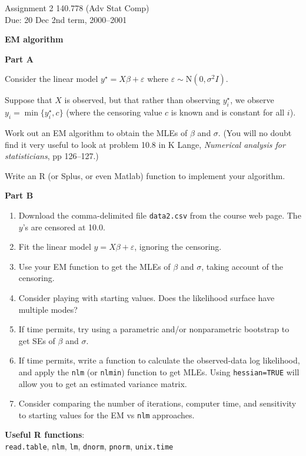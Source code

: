 \documentclass[12pt]{article}
\begin{document}
{ \large
Assignment 2 \hfill 140.778 (Adv Stat Comp)
\\
Due: 20 Dec \hfill 2nd term, 2000--2001 }

\bigskip \bigskip

{\large \textbf{EM algorithm}}

\bigskip 

\textbf{Part A}

\bigskip

Consider the linear model $y^\star = X \beta + \varepsilon$ where
$\varepsilon \sim \text{N}(0, \sigma^2I)$.  

\bigskip

Suppose that $X$ is observed, but that rather than observing $y_i^\star$, we
observe $y_i = \min\{ y_i^\star, c \}$ (where the censoring value $c$
is known and is constant for all $i$).

\bigskip

Work out an EM algorithm to obtain the MLEs of $\beta$ and $\sigma$.
(You will no doubt find it very useful to look at problem 10.8 in K
Lange, \emph{Numerical analysis for statisticians}, pp 126--127.)  

\bigskip

Write an R (or Splus, or even Matlab) function to implement your
algorithm.  

\bigskip \bigskip



\textbf{Part B}

\smallskip

\begin{enumerate}

\item Download the comma-delimited file \verb|data2.csv| from the
  course web page.  The $y$'s are censored at 10.0. 

\item Fit the linear model $y = X\beta + \varepsilon$, ignoring the
  censoring.

\item Use your EM function to get the MLEs of $\beta$ and $\sigma$,
  taking account of the censoring.

\item Consider playing with starting values.  Does the likelihood
  surface have multiple modes?

\item If time permits, try using a parametric and/or nonparametric
  bootstrap to get SEs of $\beta$ and $\sigma$.  

\item If time permits, write a function to calculate the observed-data
  log likelihood, and apply the \verb|nlm| (or \verb|nlmin|) function
  to get MLEs.  Using \verb|hessian=TRUE| will allow you to get an
  estimated variance matrix.

\item Consider comparing the number of iterations, computer time, and
  sensitivity to starting values for the EM vs \verb|nlm| approaches.

\end{enumerate}


\bigskip \bigskip

\textbf{Useful R functions}: \\
\verb|read.table|, \verb|nlm|, \verb|lm|,
\verb|dnorm|, \verb|pnorm|, \verb|unix.time|
\end{document}

